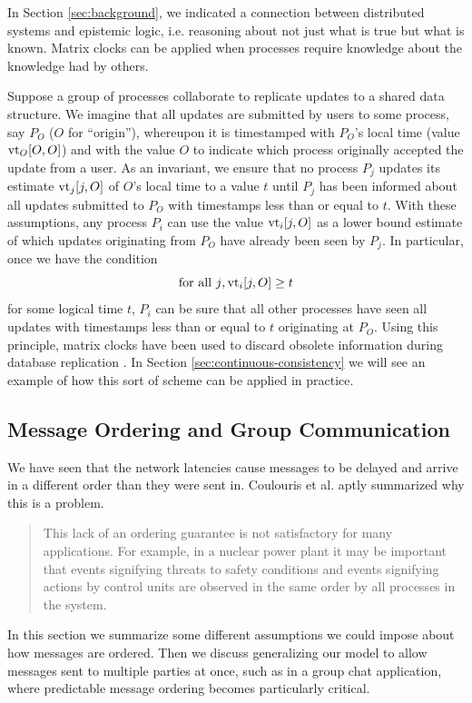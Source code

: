 \documentclass[]             %
{NASA}                       %
\theoremstyle{definition}
\begin{document}
In Section \ref{sec:background}, we indicated a connection between
distributed systems and epistemic logic, i.e. reasoning about not just
what is true but what is known. Matrix clocks can be applied when
processes require knowledge about the knowledge had by others.

Suppose a group of processes collaborate to replicate updates to a
shared data structure. We imagine that all updates are submitted by
users to some process, say $P_O$ ($O$ for ``origin''), whereupon it is
timestamped with $P_O$'s local time (value $\textrm{vt}_O[O,O]$) and with the
value $O$ to indicate which process originally accepted the update
from a user. As an invariant, we ensure that no process $P_j$ updates
its estimate $\textrm{vt}_j[j, O]$ of $O$'s local time to a value $t$ until
$P_j$ has been informed about all updates submitted to $P_O$ with
timestamps less than or equal to $t$. With these assumptions, any
process $P_i$ can use the value $\textrm{vt}_i[j, O]$ as a lower bound
estimate of which updates originating from $P_O$ have already been
seen by $P_j$. In particular, once we have the
condition
\[ \textrm{for all $j$}, \textrm{vt}_i[j, O] \geq t
\]
for some logical time $t$, $P_i$ can be sure that all other processes
have seen all updates with timestamps less than or equal to $t$
originating at $P_O$. Using this principle, matrix clocks have been
used to discard obsolete information during database replication
\cite{1987:sarinlynch}. In Section \ref{sec:continuous-consistency} we
will see an example of how this sort of scheme can be applied in
practice.

\subsection{Message Ordering and Group Communication}
We have seen that the network latencies cause messages to be delayed
and arrive in a different order than they were sent in. Coulouris et
al. \cite{coulouris2005distributed} aptly summarized why this is a
problem.
\begin{quote}
  This lack of an ordering guarantee is not satisfactory for many
  applications. For example, in a nuclear power plant it may be
  important that events signifying threats to safety conditions and
  events signifying actions by control units are observed in the same
  order by all processes in the system.
\end{quote}
In this section we summarize some different assumptions we could
impose about how messages are ordered. Then we discuss generalizing
our model to allow messages sent to multiple parties at once, such as
in a group chat application, where predictable message ordering
becomes particularly critical.
\end{document}
